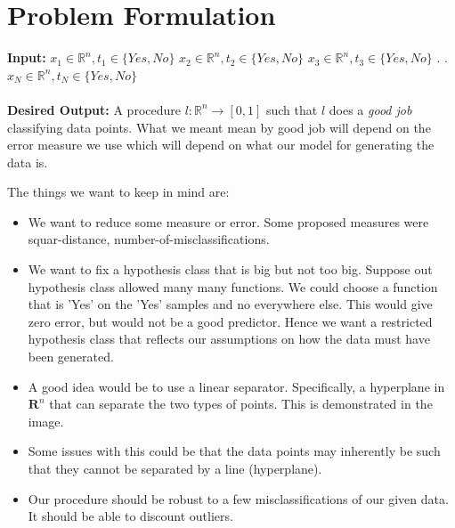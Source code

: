\documentclass{article}%
\begin{document}
\pagebreak
\section{Problem Formulation}
\textbf{Input:}
\newline
$x_1 \in \mathbb{R}^n, t_1 \in \{Yes,No\}$
\newline
$x_2 \in \mathbb{R}^n, t_2 \in \{Yes,No\}$
\newline
$x_3 \in \mathbb{R}^n, t_3 \in \{Yes,No\}$
\newline
.
\newline
.
\newline
$x_N \in \mathbb{R}^n, t_N \in \{Yes,No\}$
\\ \\
\textbf{Desired Output:}
\newline
A procedure $l: \mathbb{R}^n \rightarrow [0,1]$ such that $l$ does a \textit{good job} classifying data points. What we meant mean by good job will depend on the error measure we use which will depend on what our model for generating the data is.


The things we want to keep in mind are:
\begin{itemize}
\item We want to reduce some measure or error. Some proposed measures were squar-distance, number-of-misclassifications.
\item We want to fix a hypothesis class that is big but not too big. Suppose out hypothesis class allowed many many functions. We could choose a function that is 'Yes' on the 'Yes' samples and no everywhere else. This would give zero error, but would not be a good predictor. Hence we want a restricted hypothesis class that reflects our assumptions on how the data must have been generated.
\item A good idea would be to use a linear separator. Specifically, a hyperplane in $\textbf{R}^n$ that can separate the two types of points. This is demonstrated in the image.
\item Some issues with this could be that the data points may inherently be such that they cannot be separated by a line (hyperplane).
\item Our procedure should be robust to a few misclassifications of our given data. It should be able to discount outliers.
\end{itemize}
\end{document}
